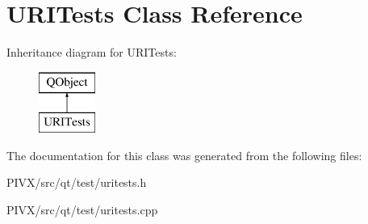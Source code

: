 \hypertarget{class_u_r_i_tests}{}\section{U\+R\+I\+Tests Class Reference}
\label{class_u_r_i_tests}
Inheritance diagram for U\+R\+I\+Tests\+:\begin{figure}[H]
\begin{center}
\leavevmode
\includegraphics[height=2.000000cm]{class_u_r_i_tests}
\end{center}
\end{figure}


The documentation for this class was generated from the following files\+:\begin{DoxyCompactItemize}
\item 
P\+I\+V\+X/src/qt/test/uritests.\+h\item 
P\+I\+V\+X/src/qt/test/uritests.\+cpp\end{DoxyCompactItemize}
